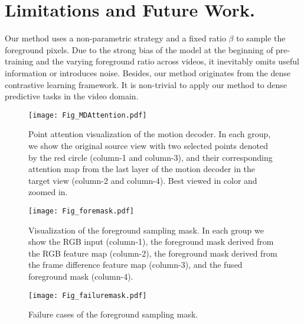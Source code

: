 \documentclass[sigconf,screen]{acmart}
\begin{document}
\section{Limitations and Future Work.}
Our method uses a non-parametric strategy and a fixed ratio $\beta$ to sample the foreground pixels. Due to the strong bias of the model at the beginning of pre-training and the varying foreground ratio across videos, it inevitably omits useful information or introduces noise. Besides, our method originates from the dense contrastive learning framework. It is non-trivial to apply our method to dense predictive tasks in the video domain.

\begin{figure*}[tbp]
\begin{center}
\texttt{[image: Fig\_MDAttention.pdf]}
\end{center}
\caption{Point attention visualization of the motion decoder. In each group, we show the original source view with two selected points denoted by the red circle (column-1 and column-3), and their corresponding attention map from the last layer of the motion decoder in the target view (column-2 and column-4). Best viewed in color and zoomed in.
}
\label{MDAttention}
\end{figure*}

\begin{figure*}[tbp]
\begin{center}
\texttt{[image: Fig\_foremask.pdf]}
\end{center}
\caption{ Visualization of the foreground sampling mask. In each group we show the RGB input (column-1), the foreground mask derived from the RGB feature map (column-2), the foreground mask derived from the frame difference feature map (column-3), and the fused foreground mask (column-4).
}
\label{foremask}
\end{figure*}

\begin{figure*}[tbp]
\begin{center}
\texttt{[image: Fig\_failuremask.pdf]}
\end{center}
\caption{Failure cases of the foreground sampling mask.
}
\label{failuremask}
\end{figure*}
\end{document}
